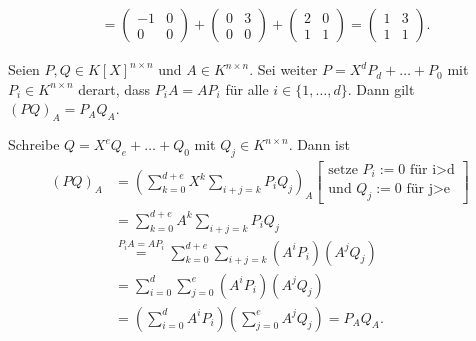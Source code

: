 \documentclass[../../main.tex]{subfiles}
\begin{document}
\begin{bsp}
\begin{align*}
        \\
        &=\begin{pmatrix}-1&0\\0&0\end{pmatrix}+\begin{pmatrix}0&3\\0&0\end{pmatrix}+\begin{pmatrix}2&0\\1&1\end{pmatrix}=\begin{pmatrix}1&3\\1&1\end{pmatrix}.
    \end{align*}
\end{bsp}

\begin{lem}\label{17.4.7}
    Seien $P,Q\in K[X]^{n\times n}$ und $A\in K^{n\times n}$. Sei weiter $P=X^dP_d+\ldots +P_0$ mit $P_i\in K^{n\times n}$ derart, dass $P_iA=AP_i$ für alle $i\in\{1,\ldots ,d\}$. Dann gilt $(PQ)_A=P_AQ_A$.
\end{lem}
\begin{cproof}
    Schreibe $Q=X^eQ_e+\ldots +Q_0$ mit $Q_j\in K^{n\times n}$. Dann ist
    \begin{align*}
        (PQ)_A&=\left(\sum_{k=0}^{d+e}X^k\sum_{i+j=k}P_iQ_j\right)_A\left[\begin{matrix}\text{setze }P_i:=0\text{ für i>d}\\\text{und }Q_j:=0\text{ für j>e}\end{matrix}\right]\\
        &=\sum_{k=0}^{d+e}A^k\sum_{i+j=k}P_iQ_j\\
        &\stackrel{P_iA=AP_i}{=}\sum_{k=0}^{d+e}\sum_{i+j=k}(A^iP_i)(A^jQ_j)\\
        &=\sum_{i=0}^d\sum_{j=0}^e(A^i P_i)(A^j Q_j)\\
        &=\left(\sum_{i=0}^d A^iP_i\right)\left(\sum_{j=0}^e A^jQ_j\right)=P_AQ_A.
    \end{align*}
\end{cproof}
\end{document}
